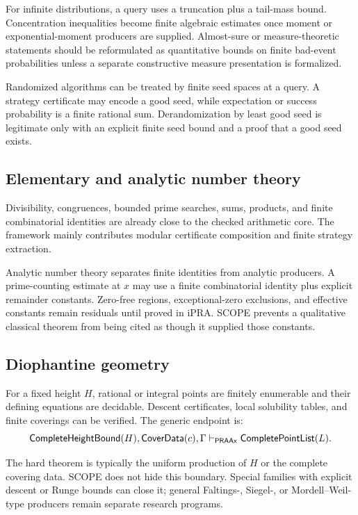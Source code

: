 For infinite distributions, a query uses a truncation plus a tail-mass bound.  Concentration inequalities become finite algebraic estimates once moment or exponential-moment producers are supplied.  Almost-sure or measure-theoretic statements should be reformulated as quantitative bounds on finite bad-event probabilities unless a separate constructive measure presentation is formalized.

Randomized algorithms can be treated by finite seed spaces at a query.  A strategy certificate may encode a good seed, while expectation or success probability is a finite rational sum.  Derandomization by least good seed is legitimate only with an explicit finite seed bound and a proof that a good seed exists.

\subsection{Elementary and analytic number theory}

Divisibility, congruences, bounded prime searches, sums, products, and finite combinatorial identities are already close to the checked arithmetic core.  The framework mainly contributes modular certificate composition and finite strategy extraction.

Analytic number theory separates finite identities from analytic producers.  A prime-counting estimate at \(x\) may use a finite combinatorial identity plus explicit remainder constants.  Zero-free regions, exceptional-zero exclusions, and effective constants remain residuals until proved in iPRA.  SCOPE prevents a qualitative classical theorem from being cited as though it supplied those constants.

\subsection{Diophantine geometry}

For a fixed height \(H\), rational or integral points are finitely enumerable and their defining equations are decidable.  Descent certificates, local solubility tables, and finite coverings can be verified.  The generic endpoint is:
\[
  \mathsf{CompleteHeightBound}(H),\mathsf{CoverData}(c),\Gamma
  \vdash_{\mathsf{PRAAx}}\mathsf{CompletePointList}(L).
\]

The hard theorem is typically the uniform production of \(H\) or the complete covering data.  SCOPE does not hide this boundary.  Special families with explicit descent or Runge bounds can close it; general Faltings-, Siegel-, or Mordell--Weil-type producers remain separate research programs.

